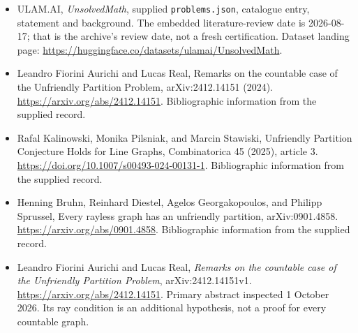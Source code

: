 \documentclass[11pt,a4paper]{article}
\begin{document}
{\small

\begin{itemize}

\item[\hypertarget{source:statement:1}{S1}] ULAM.AI, \emph{UnsolvedMath}, supplied \texttt{problems.json}, catalogue entry, statement and background. The embedded literature-review date is 2026-08-17; that is the archive’s review date, not a fresh certification. Dataset landing page: \url{https://huggingface.co/datasets/ulamai/UnsolvedMath}.

\item[\hypertarget{source:statement:2}{S2}] Leandro Fiorini Aurichi and Lucas Real, Remarks on the countable case of the Unfriendly Partition Problem, arXiv:2412.14151 (2024). \url{https://arxiv.org/abs/2412.14151}. Bibliographic information from the supplied record.

\item[\hypertarget{source:statement:3}{S3}] Rafal Kalinowski, Monika Pilsniak, and Marcin Stawiski, Unfriendly Partition Conjecture Holds for Line Graphs, Combinatorica 45 (2025), article 3. \url{https://doi.org/10.1007/s00493-024-00131-1}. Bibliographic information from the supplied record.

\item[\hypertarget{source:statement:4}{S4}] Henning Bruhn, Reinhard Diestel, Agelos Georgakopoulos, and Philipp Sprussel, Every rayless graph has an unfriendly partition, arXiv:0901.4858. \url{https://arxiv.org/abs/0901.4858}. Bibliographic information from the supplied record.


\item[E1] Leandro Fiorini Aurichi and Lucas Real,
\emph{Remarks on the countable case of the Unfriendly Partition
Problem}, arXiv:2412.14151v1. \url{https://arxiv.org/abs/2412.14151}.
Primary abstract inspected 1 October 2026. Its ray condition is an
additional hypothesis, not a proof for every countable graph.

\end{itemize}

}

\label{end:statement}
\end{document}
